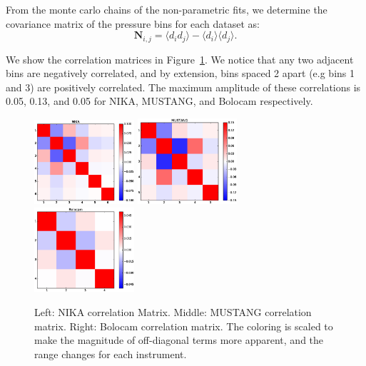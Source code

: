\documentclass[twocolumn,traditabstract]{aa}
\begin{document}
From the monte carlo chains of the non-parametric fits, we determine the covariance matrix of the pressure bins for each dataset as:
\begin{equation}
  \mathbf{N}_{i,j} = \langle d_i d_j \rangle - \langle d_i \rangle \langle d_j \rangle.
  \label{eqn:covariance}
\end{equation}

We show the correlation matrices in Figure~\ref{fig:corr_matrices}. We notice
    that any two adjacent bins are negatively correlated, and by extension, bins spaced 2 apart (e.g bins 1 and 3) are positively
    correlated. The maximum amplitude of these correlations is 0.05, 0.13, and 0.05 for NIKA, MUSTANG, and Bolocam respectively.

\begin{figure}[h]
  \centering
  \includegraphics[width=0.33\textwidth]{NIKA_ml_deproj_figs/Real_Joint_gNFW_Real_11011111_2500S_500B_100W_NIKA_correlation_matrix_clim_bwr.eps}
  \includegraphics[width=0.33\textwidth]{NIKA_ml_deproj_figs/Real_Joint_gNFW_Real_11011111_2500S_500B_100W_MUSTANG_correlation_matrix_clim_bwr.eps}
  \includegraphics[width=0.33\textwidth]{NIKA_ml_deproj_figs/Real_Joint_gNFW_Real_11011111_2500S_500B_100W_Bolocam_correlation_matrix_clim_bwr.eps}
  \caption{Left: NIKA correlation Matrix. Middle: MUSTANG correlation matrix. Right: Bolocam correlation matrix. The coloring is
    scaled to make the magnitude of off-diagonal terms more apparent, and the range changes for each instrument.}
  \label{fig:corr_matrices}
\end{figure}
\end{document}
